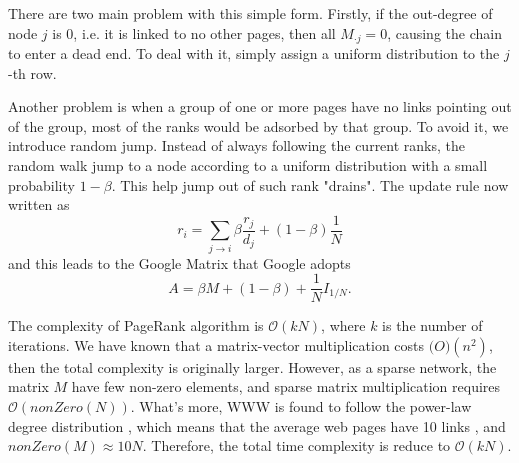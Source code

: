 \documentclass[catalog.tex]{subfiles}
\begin{document}
\begin{Algorithm}[PageRank\label{alg:\currfilebase}]
    \BlankLine

    


\end{Algorithm}

There are two main problem with this simple form. Firstly, if the out-degree of node $j$ is 0, i.e. it is linked to no other pages, then all $M_{\cdot j}=0$, causing the chain to enter a dead end. To deal with it, simply assign a uniform distribution to the $j$-th row. 

Another problem is when a group of one or more pages have no links pointing out of the group, most of the ranks would be adsorbed by that group. To avoid it, we introduce random jump. Instead of always following the current ranks, the random walk jump to a node according to a uniform distribution with a small probability $1-\beta$. This help jump out of such rank "drains". The update rule now written as \cite{bharat1998improved}
$$
r_{i}=\sum_{j \rightarrow i} \beta \frac{r_{j}}{d_{j}}+(1-\beta) \frac{1}{N}
$$
and this leads to the Google Matrix that Google adopts
$$
A=\beta M + (1-\beta) + \frac{1}{N} I_{1/N}.
$$

The complexity of PageRank algorithm is $\mathcal{O}(kN)$, where $k$ is the number of iterations. We have known that a matrix-vector multiplication costs $\mathcal(O)(n^2)$, then the total complexity is originally larger. However, as a sparse network, the matrix $M$ have few non-zero elements, and sparse matrix multiplication requires $\mathcal{O}(nonZero(N))$. What's more, WWW is found to follow the power-law degree distribution \cite{huberman1999growth}, which means that the average web pages have 10 links \cite{leskovec2009community}, and $nonZero(M) \approx 10N$. Therefore, the total time complexity is reduce to $\mathcal{O}(kN)$.
\end{document}
